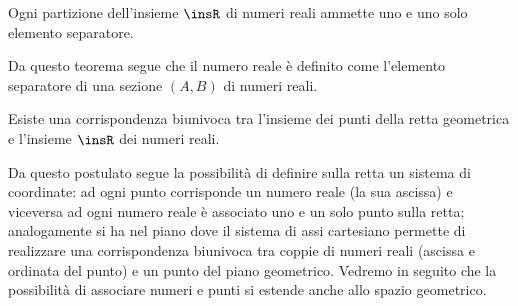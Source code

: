 \begin{teorema}[di Dedekind]
Ogni partizione dell'insieme $\insR$ di numeri reali ammette uno e uno solo 
elemento separatore.
\end{teorema}

Da questo teorema segue che il numero reale è definito come l'elemento 
separatore di una sezione $(A,B)$ di numeri reali.

\begin{postulato}
Esiste una corrispondenza biunivoca tra l'insieme dei punti della retta 
geometrica e l'insieme $\insR$ dei numeri reali.
\end{postulato}

Da questo postulato segue la possibilità di definire sulla retta un sistema di 
coordinate: ad ogni punto corrisponde un numero reale (la sua ascissa) e 
viceversa ad ogni numero reale è associato uno e un solo punto sulla retta; 
analogamente si ha nel piano dove il sistema di assi cartesiano permette di 
realizzare una corrispondenza biunivoca tra coppie di numeri reali (ascissa e 
ordinata del punto) e un punto del piano geometrico. Vedremo in seguito che la 
possibilità di associare numeri e punti si estende anche allo spazio geometrico.

% 

